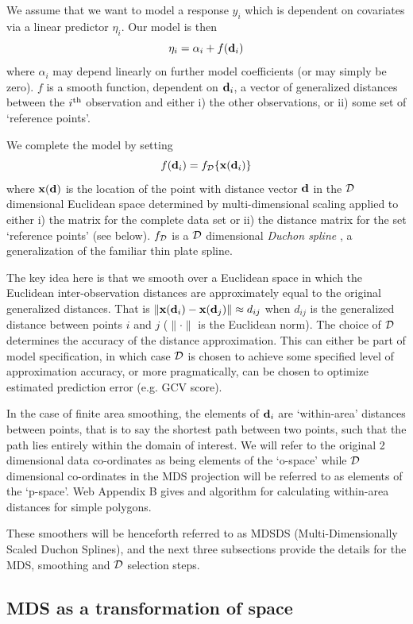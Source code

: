 \documentclass[smallextended]{svjour3}       %
\begin{document}
We assume that we want to model a response $y_i$ which is dependent on covariates via a linear predictor $\eta_i$. Our model is then
$$
\eta_i = \alpha_i + f({\bf d}_i)
$$
where $\alpha_i$ may depend linearly on further model coefficients (or may simply be zero). $f$ is a smooth function, dependent on ${\bf d}_i$, a vector of generalized distances between the $i^{\rm th}$ observation and either i) the other observations, or ii) some set of `reference points'. 

We complete the model by setting 
$$
f({\bf d}_i) = f_{\cal D}\{{\bf x}({\bf d}_i)\}
$$
where ${\bf x}({\bf d})$ is the location of the point with distance vector $\bf d$ in the $\cal D$ dimensional 
Euclidean space determined by multi-dimensional scaling applied to either i) the matrix for the complete data set or ii) the distance matrix for the set `reference points' (see below). $f_{\cal D}$ is a $\cal D$ dimensional \textit{Duchon spline} \citep{Duchon:1977tr}, a generalization of the familiar thin plate spline. 

The key idea here is that we smooth over a Euclidean space  in which the Euclidean inter-observation distances are approximately equal to the original generalized distances. That is  $\|{\bf x}({\bf d}_i) - {\bf x}({\bf d}_j) \| \approx d_{ij}$ when $d_{ij}$ is the generalized distance between points $i$ and $j$ ($\|\cdot \|$ is the Euclidean norm). The choice of $\cal D$ determines the accuracy of the distance approximation. This can either be part of model specification, in which case $\cal D$ is chosen to achieve some specified level of approximation accuracy, or more pragmatically, can be chosen to optimize estimated prediction error (e.g. GCV score).

In the case of finite area smoothing, the elements of ${\bf d}_i$ are `within-area' distances between points, that is to say the shortest path between two points, such that the path lies entirely within the domain of interest. We will refer to the original 2 dimensional data co-ordinates as being elements of the `o-space' while $\cal D$ dimensional co-ordinates in the MDS projection will be referred to as elements of the `p-space'. Web Appendix B gives and algorithm for calculating within-area distances for simple polygons. 

These smoothers will be henceforth referred to as MDSDS (Multi-Dimensionally Scaled Duchon Splines), and the next three subsections provide the details for the MDS, smoothing and $\cal D$ selection steps.

\subsection{MDS as a transformation of space}
\end{document}
